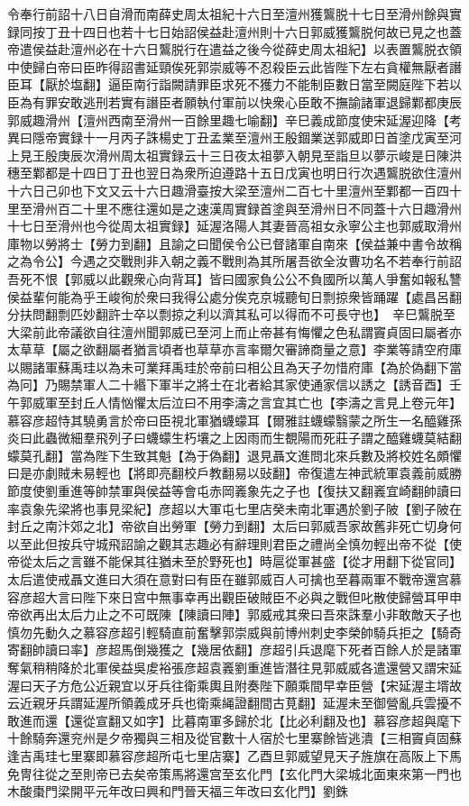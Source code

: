 令奉行前詔十八日自滑而南薛史周太祖紀十六日至澶州獲鸗脱十七日至滑州餘與實録同按丁丑十四日也若十七日始詔侯益赴澶州則十六日郭威獲鸗脱何故已見之也蓋帝遣侯益赴澶州必在十六日鸗脱行在遣益之後今從薛史周太祖紀】以表置鸗脱衣領中使歸白帝曰臣昨得詔書延頸俟死郭崇威等不忍殺臣云此皆陛下左右貪權無厭者譖臣耳【厭於塩翻】逼臣南行詣闕請罪臣求死不獲力不能制臣數日當至闕庭陛下若以臣為有罪安敢逃刑若實有譖臣者願執付軍前以快衆心臣敢不撫諭諸軍退歸鄴都庚辰郭威趣滑州【澶州西南至滑州一百餘里趣七喻翻】辛巳義成節度使宋延渥迎降【考異曰隱帝實録十一月丙子誅楊史丁丑孟業至澶州王殷錮業送郭威即日首塗戊寅至河上見王殷庚辰次滑州周太祖實録云十三日夜太祖夢入朝見至詣旦以夢示峻是日陳洪穗至鄴都是十四日丁丑也翌日為衆所迫遵路十五日戊寅也明日行次遇鸗脱欲住澶州十六日己卯也下文又云十六日趣滑臺按大梁至澶州二百七十里澶州至鄴都一百四十里至滑州百二十里不應往還如是之速漢周實録首塗與至滑州日不同蓋十六日趣滑州十七日至滑州也今從周太祖實録】延渥洛陽人其妻晉高祖女永寧公主也郭威取滑州庫物以勞將士【勞力到翻】且諭之曰聞侯令公已督諸軍自南來【侯益兼中書令故稱之為令公】今遇之交戰則非入朝之義不戰則為其所屠吾欲全汝曹功名不若奉行前詔吾死不恨【郭威以此觀衆心向背耳】皆曰國家負公公不負國所以萬人爭奮如報私讐侯益輩何能為乎王峻徇於衆曰我得公處分俟克京城聽旬日剽掠衆皆踊躍【處昌呂翻分扶問翻剽匹妙翻許士卒以剽掠之利以濟其私可以得而不可長守也】　辛巳鸗脱至大梁前此帝議欲自往澶州聞郭威已至河上而止帝甚有悔懼之色私謂竇貞固曰屬者亦太草草【屬之欲翻屬者猶言頃者也草草亦言率爾欠審諦商量之意】李業等請空府庫以賜諸軍蘇禹珪以為未可業拜禹珪於帝前曰相公且為天子勿惜府庫【為於偽翻下當為冋】乃賜禁軍人二十緡下軍半之將士在北者給其家使通家信以誘之【誘音酉】壬午郭威軍至封丘人情忷懼太后泣曰不用李濤之言宜其亡也【李濤之言見上卷元年】慕容彦超恃其驍勇言於帝曰臣視北軍猶蠛蠓耳【爾雅註蠛蠓翳蒙之所生一名醯雞孫炎曰此蟲微細羣飛列子曰蠛蠓生朽壤之上因雨而生覩陽而死莊子謂之醯雞蠛莫結翻蠓莫孔翻】當為陛下生致其魁【為于偽翻】退見聶文進問北來兵數及將校姓名頗懼曰是亦劇賊未易輕也【將即亮翻校戶教翻易以䜴翻】帝復遣左神武統軍袁義前威勝節度使劉重進等帥禁軍與侯益等會屯赤岡㠖象先之子也【復扶又翻㠖宜崎翻帥讀曰率袁象先梁將也事見梁紀】彦超以大軍屯七里店癸未南北軍遇於劉子陂【劉子陂在封丘之南汴郊之北】帝欲自出勞軍【勞力到翻】太后曰郭威吾家故舊非死亡切身何以至此但按兵守城飛詔諭之觀其志趣必有辭理則君臣之禮尚全慎勿輕出帝不從【使帝從太后之言雖不能保其往猶未至於野死也】時扈從軍甚盛【從才用翻下從官同】太后遣使戒聶文進曰大須在意對曰有臣在雖郭威百人可擒也至暮兩軍不戰帝還宫慕容彦超大言曰陛下來日宫中無事幸再出觀臣破賊臣不必與之戰但叱散使歸營耳甲申帝欲再出太后力止之不可既陳【陳讀曰陣】郭威戒其衆曰吾來誅羣小非敢敵天子也慎勿先動久之慕容彦超引輕騎直前奮擊郭崇威與前博州刺史李榮帥騎兵拒之【騎奇寄翻帥讀曰率】彦超馬倒幾獲之【幾居依翻】彦超引兵退麾下死者百餘人於是諸軍奪氣稍稍降於北軍侯益吳䖍裕張彦超袁㠖劉重進皆潛往見郭威威各遣還營又謂宋延渥曰天子方危公近親宜以牙兵往衛乘輿且附奏陛下願乘間早幸臣營【宋延渥主壻故云近親牙兵謂延渥所領義成牙兵也衛乘䋲證翻間古莧翻】延渥未至御營亂兵雲擾不敢進而還【還從宣翻又如字】比暮南軍多歸於北【比必利翻及也】慕容彦超與麾下十餘騎奔還兖州是夕帝獨與三相及從官數十人宿於七里寨餘皆逃潰【三相竇貞固蘇逢吉禹珪七里寨即慕容彦超所屯七里店寨】乙酉旦郭威望見天子旌旗在高阪上下馬免冑往從之至則帝已去矣帝策馬將還宫至玄化門【玄化門大梁城北面東來第一門也木酸棗門梁開平元年改曰興和門晉天福三年改曰玄化門】劉銖